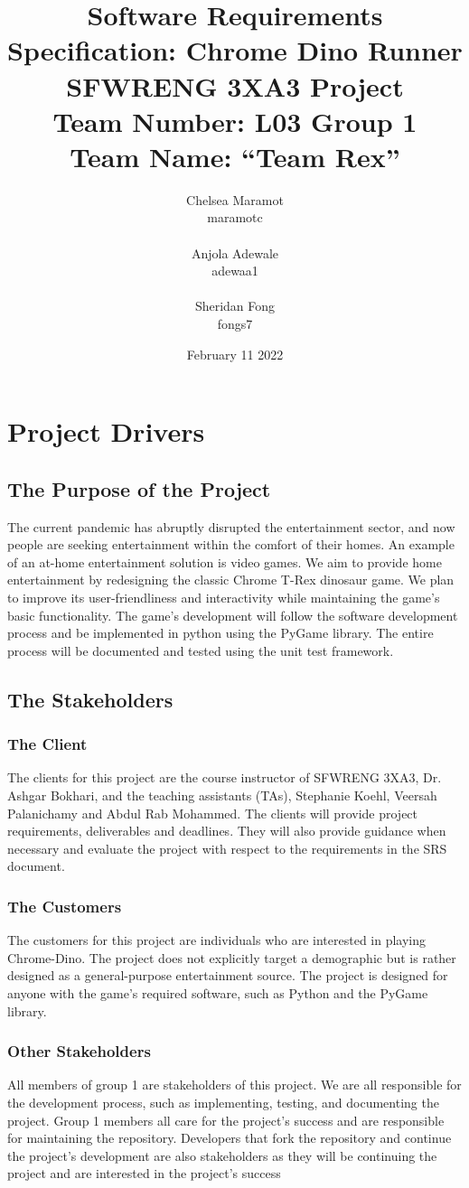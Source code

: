 \documentclass{article}
\title{Software Requirements Specification: Chrome Dino Runner \\ \bigskip \large SFWRENG 3XA3 Project \\ \bigskip \large Team Number: L03 Group 1 \\ \large Team Name: ``Team Rex'' }
\author{Chelsea Maramot \\ maramotc \\ \\ Anjola Adewale \\ adewaa1 \\ \\ Sheridan Fong \\ fongs7 }
\date{February 11 2022}
\begin{document}
\maketitle
\section{Project Drivers}
\subsection{The Purpose of the Project}
The current pandemic has abruptly disrupted the entertainment sector, and now people are seeking entertainment within the comfort of their homes. An example of an at-home entertainment solution is video games. We aim to provide home entertainment by redesigning the classic Chrome T-Rex dinosaur game. We plan to improve its user-friendliness and interactivity while maintaining the game’s basic functionality. The game's development will follow the software development process and be implemented in python using the PyGame library. The entire process will be documented and tested using the unit test framework. 
\subsection{The Stakeholders}
\subsubsection{The Client}
The clients for this project are the course instructor of SFWRENG 3XA3, Dr. Ashgar Bokhari, and the teaching assistants (TAs), Stephanie Koehl, Veersah Palanichamy and Abdul Rab Mohammed. The clients will provide project requirements, deliverables and deadlines. They will also provide guidance when necessary and evaluate the project with respect to the requirements in the SRS document. 
\subsubsection{The Customers}
The customers for this project are individuals who are interested in playing Chrome-Dino. The project does not explicitly target a demographic but is rather designed as a general-purpose entertainment source. The project is designed for anyone with the game's required software, such as Python and the PyGame library. 
\subsubsection{Other Stakeholders}
All members of group 1 are stakeholders of this project. We are all responsible for the development process, such as implementing, testing, and documenting the project. Group 1 members all care for the project's success and are responsible for maintaining the repository. Developers that fork the repository and continue the project's development are also stakeholders as they will be continuing the project and are interested in the project's success
\end{document}
